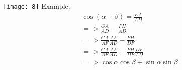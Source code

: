 \texttt{[image: 8]}
\newline
Example:
\begin{align}
	\cos(\alpha+\beta) = \frac{EA}{AD} \\
	=> \frac{GA}{AD}-\frac{FH}{AD} \\
	=> \frac{GA}{AF}\frac{AF}{AD}-\frac{FH}{DF} \\
	=> \frac{GA}{AF}\frac{AF}{AD}-\frac{FH}{DF}\frac{DF}{AD} \\
	=> \cos\alpha \cos\beta + \sin\alpha \sin\beta \\
\end{align}





